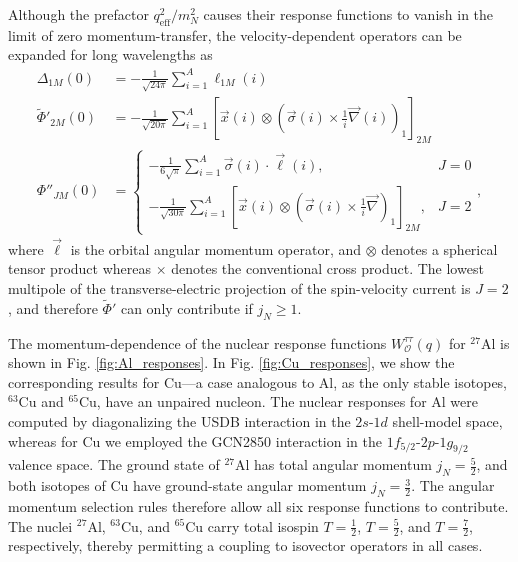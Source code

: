 \documentclass[12pt,letterpaper]{book}
\begin{document}
Although the prefactor $q_\mathrm{eff}^2/m_N^2$ causes their response functions to vanish in the limit of zero momentum-transfer, the velocity-dependent operators can be expanded for long wavelengths as
\begin{equation}
\begin{split}
\Delta_{1M}(0)&=-\frac{1}{\sqrt{24\pi}}\sum_{i=1}^A\ell_{1M}(i)\\
\tilde{\Phi}'_{2M}(0)&=-\frac{1}{\sqrt{20\pi}}\sum_{i=1}^A\left[\vec{x}(i)\otimes\left(\vec{\sigma}(i)\times\frac{1}{i}\vec{\nabla}(i)\right)_1\right]_{2M}\\
\Phi''_{JM}(0)&=\left\{\begin{array}{cc}
-\frac{1}{6\sqrt{\pi}}\sum_{i=1}^A\vec{\sigma}(i)\cdot\vec{\ell}(i), & J=0\\
-\frac{1}{\sqrt{30\pi}}\sum_{i=1}^A\left[\vec{x}(i)\otimes\left(\vec{\sigma}(i)\times\frac{1}{i}\vec{\nabla}\right)_1\right]_{2M}, & J=2
\end{array}\right.,
\end{split}
\end{equation}
where $\vec{\ell}$ is the orbital angular momentum operator, and $\otimes$ denotes a spherical tensor product whereas $\times$ denotes the conventional cross product. The lowest multipole of the transverse-electric projection of the spin-velocity current is $J=2$, and therefore $\tilde{\Phi}'$ can only contribute if $j_N\geq 1$.

The momentum-dependence of the nuclear response functions $W^{\tau\tau}_\mathcal{O}(q)$ for $^{27}$Al is shown in Fig. \ref{fig:Al_responses}. In Fig. \ref{fig:Cu_responses}, we show the corresponding results for Cu---a case analogous to Al, as the only stable isotopes, $^{63}$Cu and $^{65}$Cu, have an unpaired nucleon. The nuclear responses for Al were computed by diagonalizing the USDB interaction in the $2s$-$1d$ shell-model space, whereas for Cu we employed the GCN2850 interaction in the $1f_{5/2}$-$2p$-$1g_{9/2}$ valence space. The ground state of $^{27}$Al has total angular momentum $j_N=\frac{5}{2}$, and both isotopes of Cu have ground-state angular momentum $j_N=\frac{3}{2}$. The angular momentum selection rules therefore allow all six response functions to contribute. The nuclei $^{27}$Al, $^{63}$Cu, and $^{65}$Cu carry total isospin $T=\frac{1}{2}$, $T=\frac{5}{2}$, and $T=\frac{7}{2}$, respectively, thereby permitting a coupling to isovector operators in all cases.
\end{document}
